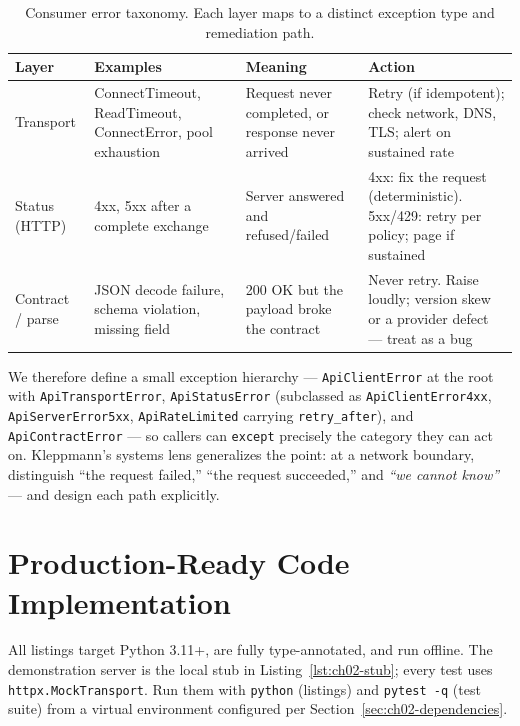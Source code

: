 \begin{table}[h]
  \centering
  \small
  \begin{tabularx}{\textwidth}{l X X X}
    \toprule
    \textbf{Layer} & \textbf{Examples} & \textbf{Meaning} & \textbf{Action} \\
    \midrule
    Transport & ConnectTimeout, ReadTimeout, ConnectError, pool exhaustion &
    Request never completed, or response never arrived & Retry (if
    idempotent); check network, DNS, TLS; alert on sustained rate \\
    Status (HTTP) & 4xx, 5xx after a complete exchange &
    Server answered and refused/failed & 4xx: fix the request (deterministic).
    5xx/429: retry per policy; page if sustained \\
    Contract / parse & JSON decode failure, schema violation, missing field &
    200 OK but the payload broke the contract & Never retry. Raise loudly;
    version skew or a provider defect --- treat as a bug \\
    \bottomrule
  \end{tabularx}
  \caption{Consumer error taxonomy. Each layer maps to a distinct exception
  type and remediation path.}
  \label{tab:ch02-error-taxonomy}
\end{table}

We therefore define a small exception hierarchy --- \texttt{ApiClientError}
at the root with \texttt{ApiTransportError}, \texttt{ApiStatusError}
(subclassed as \texttt{ApiClientError4xx}, \texttt{ApiServerError5xx},
\texttt{ApiRateLimited} carrying \texttt{retry\_after}), and
\texttt{ApiContractError} --- so callers can \texttt{except} precisely the
category they can act on. Kleppmann's systems lens
\cite{kleppmann2017ddia} generalizes the point: at a network boundary,
distinguish ``the request failed,'' ``the request succeeded,'' and
\emph{``we cannot know''} --- and design each path explicitly.


\section{Production-Ready Code Implementation}
\label{sec:ch02-code}

All listings target Python 3.11+, are fully type-annotated, and run offline.
The demonstration server is the local stub in
Listing~\ref{lst:ch02-stub}; every test uses \texttt{httpx.MockTransport}.
Run them with \texttt{python} (listings) and \texttt{pytest -q} (test suite)
from a virtual environment configured per
Section~\ref{sec:ch02-dependencies}.

